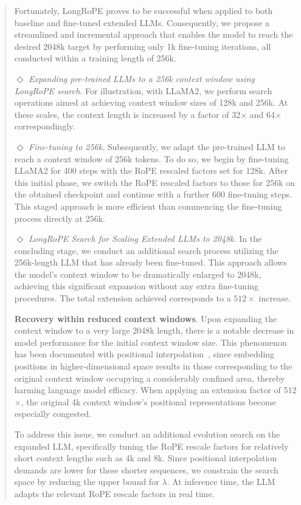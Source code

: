 \begin{abstract}
Fortunately, LongRoPE proves to be successful when applied to both baseline and fine-tuned extended LLMs. Consequently, we propose a streamlined and incremental approach that enables the model to reach the desired 2048k target by performing only 1k fine-tuning iterations, all conducted within a training length of 256k.

$\Diamond$ \textit{Expanding pre-trained LLMs to a 256k context window using LongRoPE search}. For illustration, with LLaMA2, we perform search operations aimed at achieving context window sizes of 128k and 256k. At these scales, the context length is increased by a factor of 32$\times$ and 64$\times$ correspondingly.

$\Diamond$ \textit{Fine-tuning to 256k}. Subsequently, we adapt the pre-trained LLM to reach a context window of 256k tokens. To do so, we begin by fine-tuning LLaMA2 for 400 steps with the RoPE rescaled factors set for 128k. After this initial phase, we switch the RoPE rescaled factors to those for 256k on the obtained checkpoint and continue with a further 600 fine-tuning steps. This staged approach is more efficient than commencing the fine-tuning process directly at 256k.

$\Diamond$ \textit{LongRoPE Search for Scaling Extended LLMs to 2048k}. In the concluding stage, we conduct an additional search process utilizing the 256k-length LLM that has already been fine-tuned. This approach allows the model’s context window to be dramatically enlarged to 2048k, achieving this significant expansion without any extra fine-tuning procedures. The total extension achieved corresponds to a $512\times$ increase.

\textbf{Recovery within reduced context windows}. Upon expanding the context window to a very large 2048k length, there is a notable decrease in model performance for the initial context window size. This phenomenon has been documented with positional interpolation~\cite{pi}, since embedding positions in higher-dimensional space results in those corresponding to the original context window occupying a considerably confined area, thereby harming language model efficacy. When applying an extension factor of 512$\times$, the original 4k context window's positional representations become especially congested.

To address this issue, we conduct an additional evolution search on the expanded LLM, specifically tuning the RoPE rescale factors for relatively short context lengths such as 4k and 8k. Since positional interpolation demands are lower for these shorter sequences, we constrain the search space by reducing the upper bound for $\lambda$. At inference time, the LLM adapts the relevant RoPE rescale factors in real time.


\end{abstract}

